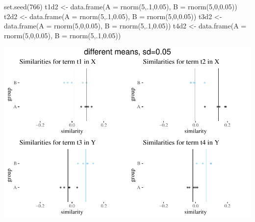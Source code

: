 \documentclass[
  10pt,
  dvipsnames,enabledeprecatedfontcommands]{scrartcl}
\newenvironment{Shaded}{\begin{snugshade}}{\end{snugshade}}
\newcommand{\AttributeTok}[1]{\textcolor[rgb]{0.77,0.63,0.00}{#1}}
\newcommand{\DecValTok}[1]{\textcolor[rgb]{0.00,0.00,0.81}{#1}}
\newcommand{\FloatTok}[1]{\textcolor[rgb]{0.00,0.00,0.81}{#1}}
\newcommand{\FunctionTok}[1]{\textcolor[rgb]{0.00,0.00,0.00}{#1}}
\newcommand{\NormalTok}[1]{#1}
\newcommand{\OtherTok}[1]{\textcolor[rgb]{0.56,0.35,0.01}{#1}}
\begin{document}
\vspace{1mm}
\footnotesize

\begin{Shaded}
\begin{Highlighting}[]
\FunctionTok{set.seed}\NormalTok{(}\DecValTok{766}\NormalTok{)}
\NormalTok{t1d2 }\OtherTok{\textless{}{-}} \FunctionTok{data.frame}\NormalTok{(}\AttributeTok{A  =} \FunctionTok{rnorm}\NormalTok{(}\DecValTok{5}\NormalTok{,.}\DecValTok{1}\NormalTok{,}\FloatTok{0.05}\NormalTok{), }\AttributeTok{B =} \FunctionTok{rnorm}\NormalTok{(}\DecValTok{5}\NormalTok{,}\DecValTok{0}\NormalTok{,}\FloatTok{0.05}\NormalTok{))}
\NormalTok{t2d2 }\OtherTok{\textless{}{-}} \FunctionTok{data.frame}\NormalTok{(}\AttributeTok{A  =} \FunctionTok{rnorm}\NormalTok{(}\DecValTok{5}\NormalTok{,.}\DecValTok{1}\NormalTok{,}\FloatTok{0.05}\NormalTok{), }\AttributeTok{B =} \FunctionTok{rnorm}\NormalTok{(}\DecValTok{5}\NormalTok{,}\DecValTok{0}\NormalTok{,}\FloatTok{0.05}\NormalTok{))}
\NormalTok{t3d2 }\OtherTok{\textless{}{-}} \FunctionTok{data.frame}\NormalTok{(}\AttributeTok{A  =} \FunctionTok{rnorm}\NormalTok{(}\DecValTok{5}\NormalTok{,}\DecValTok{0}\NormalTok{,}\FloatTok{0.05}\NormalTok{), }\AttributeTok{B =} \FunctionTok{rnorm}\NormalTok{(}\DecValTok{5}\NormalTok{,.}\DecValTok{1}\NormalTok{,}\FloatTok{0.05}\NormalTok{))}
\NormalTok{t4d2 }\OtherTok{\textless{}{-}} \FunctionTok{data.frame}\NormalTok{(}\AttributeTok{A  =} \FunctionTok{rnorm}\NormalTok{(}\DecValTok{5}\NormalTok{,}\DecValTok{0}\NormalTok{,}\FloatTok{0.05}\NormalTok{), }\AttributeTok{B =} \FunctionTok{rnorm}\NormalTok{(}\DecValTok{5}\NormalTok{,.}\DecValTok{1}\NormalTok{,}\FloatTok{0.05}\NormalTok{))}
\end{Highlighting}
\end{Shaded}

\normalsize

\vspace{1mm}
\footnotesize

\begin{center}\includegraphics[width=1\linewidth]{paperDraft_files/figure-latex/unnamed-chunk-10-1} \end{center}
\normalsize
\end{document}
